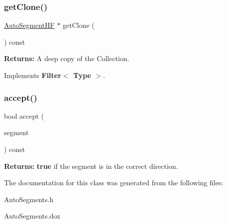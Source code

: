 \subsubsection{\texorpdfstring{get\+Clone()}{getClone()}}
{\footnotesize\ttfamily \mbox{\hyperlink{namespaceKatabatic_a790418bb65a9a13859868df3e8f53598}{Auto\+Segment\+HF}} $\ast$ get\+Clone (\begin{DoxyParamCaption}{ }\end{DoxyParamCaption}) const\hspace{0.3cm}{\ttfamily [virtual]}}

{\bfseries Returns\+:} A deep copy of the Collection. 

Implements \textbf{ Filter$<$ Type $>$}.

\mbox{\label{classKatabatic_1_1AutoSegments__InDirection_adfb5e1308226f0b97fb6825e3eab11a9}} 
\subsubsection{\texorpdfstring{accept()}{accept()}}
{\footnotesize\ttfamily bool accept (\begin{DoxyParamCaption}\item[{\mbox{\hyperlink{classKatabatic_1_1AutoSegment}{Auto\+Segment}} $\ast$}]{segment }\end{DoxyParamCaption}) const\hspace{0.3cm}{\ttfamily [virtual]}}

{\bfseries Returns\+:} {\bfseries true} if the {\ttfamily segment} is in the correct direction. 

The documentation for this class was generated from the following files\+:\begin{DoxyCompactItemize}
\item 
Auto\+Segments.\+h\item 
Auto\+Segments.\+dox\end{DoxyCompactItemize}
